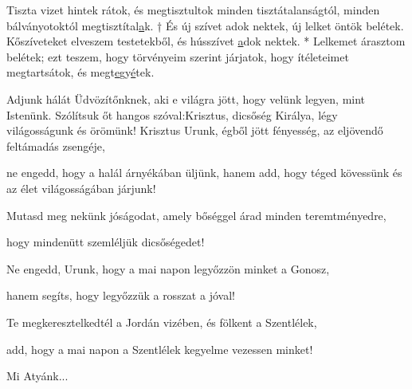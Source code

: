 \documentclass[twoside]{article}
\begin{document}


\begin{psalmsheet}[tone=8, continuous, number={150. zsoltár}, title={Dicsérjétek az Urat!}, motto={Daloljon a lelketek, daloljon a szívetek is, vagyis dicsőítsétek meg Istent lelketekben és testetekben egyaránt! (Hesychius)}]
\end{psalmsheet}

Tiszta vizet hintek rátok, és megtisztultok minden tisztátalanságtól, minden bálványotoktól
megtisztítal\underline{a}k. † És új szívet adok nektek, új lelket öntök belétek. Kőszíveteket
elveszem testetekből, és hússzívet \underline{a}dok nektek. * Lelkemet árasztom belétek; ezt teszem,
hogy törvényeim szerint járjatok, hogy ítéleteimet megtartsátok, és
megt\underline{e}gy\underline{é}tek.







\begin{preces}{Adjunk hálát Üdvözítőnknek, aki e világra jött, hogy velünk legyen, mint Istenünk.
Szólítsuk őt hangos szóval:}{Krisztus, dicsőség Királya, légy világosságunk és örömünk!}
  Krisztus Urunk, égből jött fényesség, az eljövendő feltámadás zsengéje,

  \reddash ne engedd, hogy a halál árnyékában üljünk, hanem add, hogy téged kövessünk és az élet világosságában járjunk!

  Mutasd meg nekünk jóságodat, amely bőséggel árad minden teremtményedre,

  \reddash hogy mindenütt szemléljük dicsőségedet!

  Ne engedd, Urunk, hogy a mai napon legyőzzön minket a Gonosz,

  \reddash hanem segíts, hogy legyőzzük a rosszat a jóval!

  Te megkeresztelkedtél a Jordán vizében, és fölkent a Szentlélek,

  \reddash add, hogy a mai napon a Szentlélek kegyelme vezessen minket!
\end{preces}
Mi Atyánk...
\end{document}
